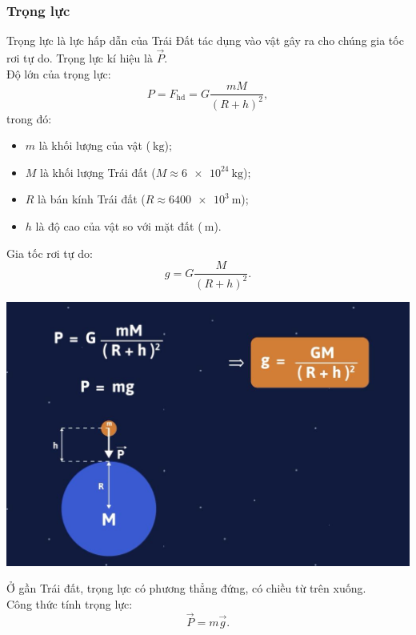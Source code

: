\subsubsection{Trọng lực }

Trọng lực là lực hấp dẫn của Trái Đất tác dụng vào vật gây ra cho chúng gia tốc rơi tự do. Trọng lực kí hiệu là $\vec P.$\\
Độ lớn của trọng lực:
\begin{equation*}
	P=F_{\text{hd}}=G \dfrac {mM}{(R+h)^2},
\end{equation*}
trong đó:
\begin{itemize}
	\item $m$ là khối lượng của vật ($\SI{}{\kilogram}$);
	\item $M$ là khối lượng Trái đất ($M \approx \SI{6e24}{\kilogram}$);
	\item $R$ là bán kính Trái đất ($R \approx \SI{6400e3}{\meter}$);
	\item $h$ là  độ cao của vật so với mặt đất ($\SI{}{\meter}$).
\end{itemize}

Gia tốc rơi tự do:
\begin{equation*}
	g=G \dfrac {M}{(R+h)^2}.
\end{equation*}
\begin{center}
	\includegraphics[scale=0.4]{../figs/VN10-PH-13-A-004-1-V2-01.jpg}
\end{center}
Ở gần Trái đất, trọng lực có phương thẳng đứng, có chiều từ trên xuống. \\
Công thức tính trọng lực: 
\begin{equation*}
	\vec P=m\vec g.
\end{equation*}

